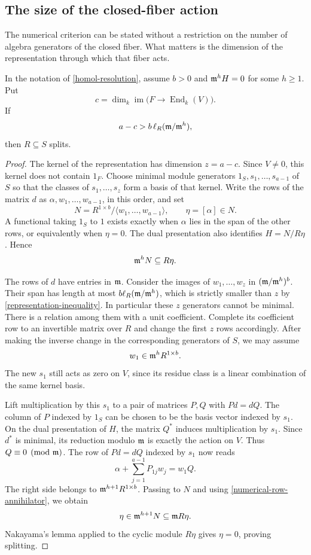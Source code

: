 \subsection{The size of the closed-fiber action}
The numerical criterion can be stated without a restriction on the
number of algebra generators of the closed fiber.  What matters is
the dimension of the representation through which that fiber acts.

\begin{proposition}\label{representation-bound}
In the notation of \eqref{homol-resolution}, assume $b>0$ and
$\mathfrak m^hH=0$ for some $h\geq1$.  Put
\[
 c=\dim_k\operatorname{im}
       \bigl(F\longrightarrow\operatorname{End}_k(V)\bigr).
\]
If
\begin{equation}\label{representation-inequality}
 a-c>b\,\ell_R(\mathfrak m/\mathfrak m^h),
\end{equation}
then $R\subseteq S$ splits.
\end{proposition}
\begin{proof}
The kernel of the representation has dimension $z=a-c$.
Since $V\ne0$, this kernel does not contain $1_F$.  Choose minimal
module generators $1_S,s_1,\ldots,s_{a-1}$ of $S$ so that the
classes of $s_1,\ldots,s_z$ form a basis of that kernel.
Write the rows of the matrix $d$ as
$\alpha,w_1,\ldots,w_{a-1}$, in this order, and set
\[
 N=R^{1\times b}/\langle w_1,\ldots,w_{a-1}\rangle,
 \qquad \eta=[\alpha]\in N.
\]
A functional taking $1_S$ to $1$ exists exactly when $\alpha$ lies
in the span of the other rows, or equivalently when $\eta=0$.
The dual presentation also identifies $H=N/R\eta$.  Hence
\begin{equation}\label{numerical-row-annihilator}
 \mathfrak m^hN\subseteq R\eta.
\end{equation}

The rows of $d$ have entries in $\mathfrak m$.  Consider the images of
$w_1,\ldots,w_z$ in $(\mathfrak m/\mathfrak m^h)^b$.  Their span has length at most
$b\ell_R(\mathfrak m/\mathfrak m^h)$, which is strictly smaller than $z$ by
\eqref{representation-inequality}.  In particular these $z$
generators cannot be minimal.  There is a relation among them
with a unit coefficient.  Complete its coefficient row to an
invertible matrix over $R$ and change the first $z$ rows accordingly.
After making the inverse change in the corresponding generators
of $S$, we may assume
\[
 w_1\in\mathfrak m^h R^{1\times b}.
\]
The new $s_1$ still acts as zero on $V$, since its residue class is
a linear combination of the same kernel basis.

Lift multiplication by this $s_1$ to a pair of matrices $P,Q$ with
$Pd=dQ$.  The column of $P$ indexed by $1_S$ can be chosen to be
the basis vector indexed by $s_1$.  On the dual presentation of
$H$, the matrix $Q^*$ induces multiplication by $s_1$. Since
$d^*$ is minimal, its reduction modulo $\mathfrak m$ is exactly the action
on $V$.  Thus $Q\equiv0\pmod{\mathfrak m}$.  The row of $Pd=dQ$ indexed by
$s_1$ now reads
\[
 \alpha+\sum_{j=1}^{a-1}P_{1j}w_j=w_1Q.
\]
The right side belongs to $\mathfrak m^{h+1}R^{1\times b}$.  Passing to
$N$ and using \eqref{numerical-row-annihilator}, we obtain
\[
 \eta\in\mathfrak m^{h+1}N\subseteq\mathfrak m R\eta.
\]
Nakayama's lemma applied to the cyclic module $R\eta$ gives
$\eta=0$, proving splitting.
\end{proof}

